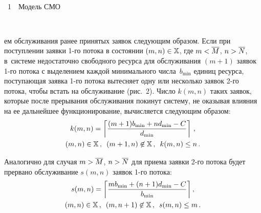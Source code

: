 \begin{multicols}{2}
{ \begin{center}  %
 \vspace*{3pt}
    \mbox{%
 \epsfxsize=79mm 
 }
\vspace*{3pt}

\noindent
{{\figurename~1}\ \ \small{Модель СМО}}
\end{center}
}



\setcounter{figure}{1}
\begin{figure*} %
\vspace*{1pt}
    \begin{center}  
  \mbox{%
 \epsfxsize=161.667mm 
 }
\end{center}
\vspace*{-11pt}
\end{figure*}



\pagebreak

\noindent
ем обслуживания ранее 
принятых заявок следу\-ющим образом. Если при поступлении заявки 1-го 
потока в состоянии $(m,n)\hm\in \mathbb{X}$, где $m\hm<\overline{M}$, 
$n\hm>\overline{N}$,  
в~сис\-т\-еме недостаточно свободного ресурса для обслуживания $(m+1)$ 
заявок 1-го потока с выделением каждой минимального числа~$b_{\min}$ 
единиц ресурса, поступающая заявка 1-го потока вытесняет одну или 
несколько заявок 2-го потока, чтобы встать на обслуживание (рис.~2). 
Число $k(m,n)$ таких заявок, которые после прерывания обслуживания 
покинут систему, не оказывая влияния на ее дальнейшее функционирование, 
вычисляется следующим образом:
  \begin{multline*}
  k(m,n)=\left\lceil \displaystyle\frac{\displaystyle (m+1)b_{\min}+nd_{\min}-C\mathstrut}{\displaystyle d_{\min}\mathstrut}\right\rceil\,,\\ 
(m,n)\in\mathbb{X}\,,\enskip (m+1,n)\not\in\mathbb{X}\,,\enskip k(m,n)\leq n\,.
\end{multline*}
  
  Аналогично для случая $m\hm>\overline{M}$, $n\hm> \overline{N}$ для 
при\-ема заявки 2-го потока будет прервано обслуживание $s(m,n)$ заявок 1-го потока:
  \begin{multline*}
  s(m,n)= \left\lceil \displaystyle\frac{\displaystyle mb_{\min}+(n+1)d_{\min}-C\mathstrut}{\displaystyle b_{\min}\mathstrut}\right\rceil,\\ 
(m,n)\in\mathbb{X}\,,\enskip (m,n+1)\not\in\mathbb{X}\,,\enskip s(m,n)\leq m\,.
 \end{multline*}
  

\end{multicols}
